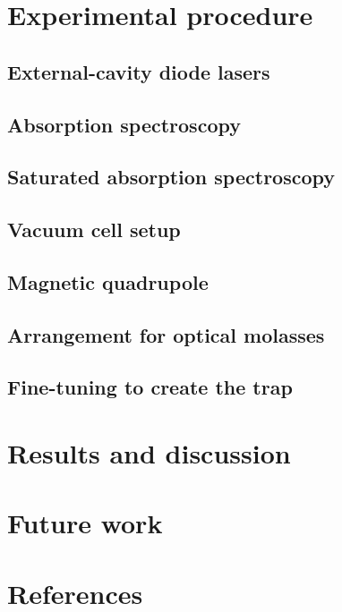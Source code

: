 \documentclass[11pt,twoside,a4paper]{article}
\begin{document}
\section{Experimental procedure}
\subsection{External-cavity diode lasers}
\subsection{Absorption spectroscopy}
\subsection{Saturated absorption spectroscopy}
\subsection{Vacuum cell setup}
\subsection{Magnetic quadrupole}
\subsection{Arrangement for optical molasses}
\subsection{Fine-tuning to create the trap}
\section{Results and discussion}
\section{Future work}
\vfill
\pagebreak
\section{References}


\end{document}
